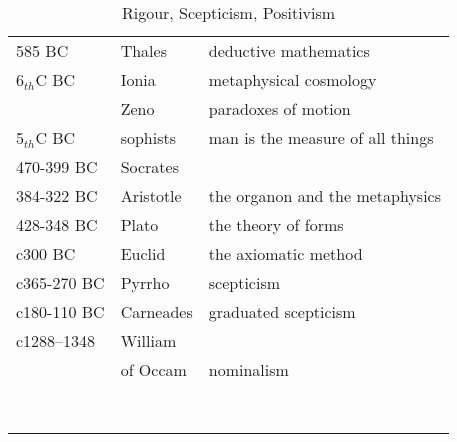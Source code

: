 \begin{table}[h]
\begin{center}
\begin{tabular}{|l l p{5cm}|}
\hline
585 BC & Thales & deductive mathematics \\
6$_{th}$C BC & Ionia & metaphysical cosmology \\
 & Zeno & paradoxes of motion \\
5$_{th}$C BC & sophists & man is the measure of all things \\
470-399 BC & Socrates & \\
384-322 BC & Aristotle & the organon and the metaphysics \\
428-348 BC & Plato & the theory of forms \\

c300 BC & Euclid & the axiomatic method \\
c365-270 BC & Pyrrho & scepticism \\
c180-110 BC & Carneades & graduated scepticism \\
c1288–1348 & William & \\
& of Occam & nominalism \\
 &  & \\
 &  & \\
 &  & \\
 &  & \\
 &  & \\
 &  & \\
 &  & \\
 &  & \\
\hline
\end{tabular}
\caption{Rigour, Scepticism, Positivism}
\label{tab:RigourScepticismPositivism}
\end{center}
\end{table}
